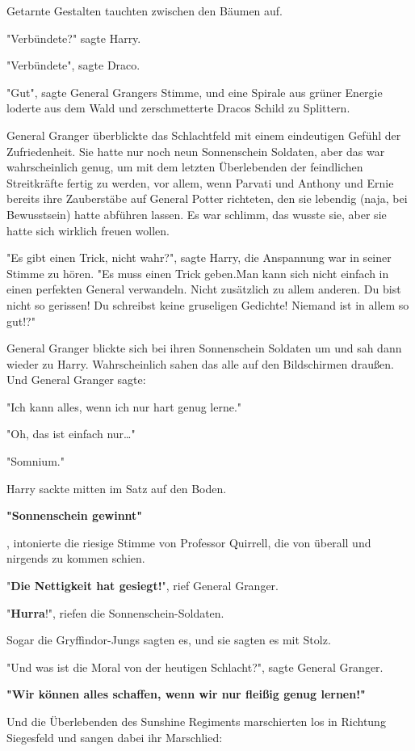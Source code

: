 {Getarnte Gestalten tauchten zwischen den Bäumen auf.

"Verbündete?" sagte Harry.

"Verbündete", sagte Draco.

"Gut", sagte General Grangers Stimme, und eine Spirale aus grüner Energie loderte aus dem Wald und zerschmetterte Dracos Schild zu Splittern.

General Granger überblickte das Schlachtfeld mit einem eindeutigen Gefühl der Zufriedenheit. Sie hatte nur noch neun Sonnenschein Soldaten, aber das war wahrscheinlich genug, um mit dem letzten Überlebenden der feindlichen Streitkräfte fertig zu werden, vor allem, wenn Parvati und Anthony und Ernie bereits ihre Zauberstäbe auf General Potter richteten, den sie lebendig (naja, bei Bewusstsein) hatte abführen lassen. Es war schlimm, das wusste sie, aber sie hatte sich wirklich freuen wollen.

"Es gibt einen Trick, nicht wahr?", sagte Harry, die Anspannung war in seiner Stimme zu hören. "Es muss einen Trick geben.Man kann sich nicht einfach in einen perfekten General verwandeln. Nicht zusätzlich zu allem anderen. Du bist nicht so gerissen! Du schreibst keine gruseligen Gedichte! Niemand ist in allem so gut!?"

General Granger blickte sich bei ihren Sonnenschein Soldaten um und sah dann wieder zu Harry. Wahrscheinlich sahen das alle auf den Bildschirmen draußen. Und General Granger sagte:

"Ich kann alles, wenn ich nur hart genug lerne."

"Oh, das ist einfach nur…"

"Somnium."

Harry sackte mitten im Satz auf den Boden.

\textbf{"Sonnenschein gewinnt"}

, intonierte die riesige Stimme von Professor Quirrell, die von überall und nirgends zu kommen schien.

"\textbf{Die Nettigkeit hat gesiegt!}", rief General Granger.

"\textbf{Hurra}!", riefen die Sonnenschein-Soldaten.

Sogar die Gryffindor-Jungs sagten es, und sie sagten es mit Stolz.

"Und was ist die Moral von der heutigen Schlacht?", sagte General Granger.

\textbf{"Wir können alles schaffen, wenn wir nur fleißig genug lernen!"}

Und die Überlebenden des Sunshine Regiments marschierten los in Richtung Siegesfeld und sangen dabei ihr Marschlied:

}
